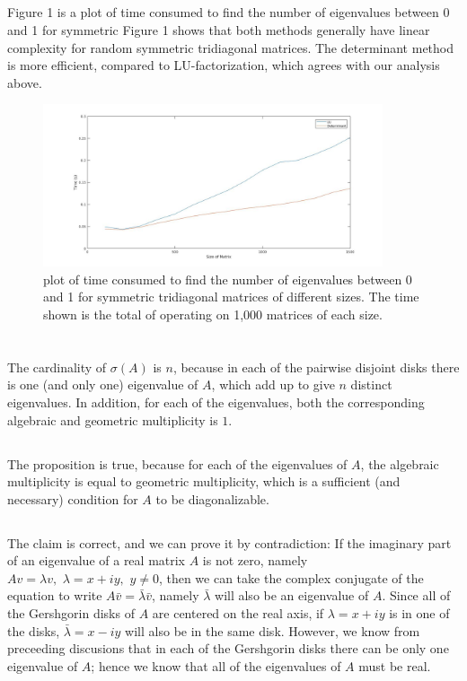 \documentclass[11pt]{article}
\begin{document}
\subsection{}
Figure 1 is a plot of time consumed to find the number of eigenvalues between 0 and 1 for symmetric 
Figure 1 shows that both methods generally have linear complexity for random symmetric tridiagonal matrices. The determinant method is more efficient, compared to LU-factorization, which agrees with our analysis above.
\begin{figure}[t]
\centering
{
\includegraphics[width=10cm]{matlab/prob1.jpg}
\caption{plot of time consumed to find the number of eigenvalues between 0 and 1 for symmetric tridiagonal matrices of different sizes. The time shown is the total of operating on 1,000 matrices of each size.}
}
\end{figure}
\pagebreak
\section{}
\subsection{}
The cardinality of $\sigma(A)$ is $n$, because in each of the pairwise disjoint disks there is one (and only one) eigenvalue of $A$, which add up to give $n$ distinct eigenvalues. In addition, for each of the eigenvalues, both the corresponding algebraic and geometric multiplicity is $1$.

\subsection{}
The proposition is true, because for each of the eigenvalues of $A$, the algebraic multiplicity is equal to geometric multiplicity, which is a sufficient (and necessary) condition for $A$ to be diagonalizable.

\subsection{}
The claim is correct, and we can prove it by contradiction: If the imaginary part of an eigenvalue of a real matrix $A$ is not zero, namely $Av=\lambda v,\,\,\lambda =x+iy,\,\,y\neq0$, then we can take the complex conjugate of the equation to write $A\bar v = \bar\lambda\bar v$, namely $\bar\lambda$ will also be an eigenvalue of $A$. Since all of the Gershgorin disks of $A$ are centered on the real axis, if $\lambda=x+iy$ is in one of the disks, $\bar\lambda=x-iy$ will also be in the same disk. However, we know from preceeding discusions that in each of the Gershgorin disks there can be only one eigenvalue of $A$; hence we know that all of the eigenvalues of $A$ must be real.
\end{document}
